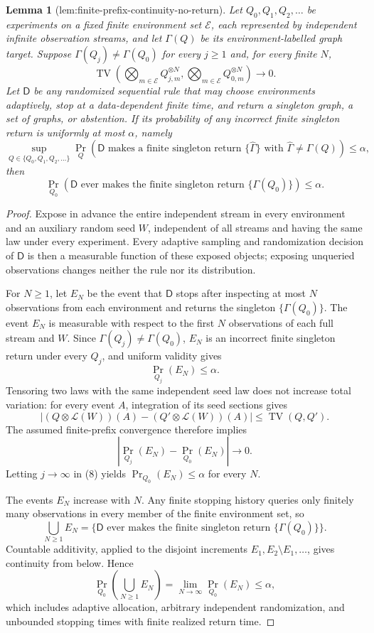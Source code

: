 \documentclass{article}
\newtheorem{lemma}{Lemma}
\begin{document}
\begin{lemma}[lem:finite-prefix-continuity-no-return]\label{lem:finite-prefix-continuity-no-return}
Let \(Q_0,Q_1,Q_2,\ldots\) be experiments on a fixed finite environment set \(\mathcal E\), each represented by independent infinite observation streams, and let \(\Gamma(Q)\) be its environment-labelled graph target.  Suppose \(\Gamma(Q_j)\ne\Gamma(Q_0)\) for every \(j\ge1\) and, for every finite \(N\),
\[
 \operatorname{TV}\!\left(
   \bigotimes_{m\in\mathcal E}Q_{j,m}^{\otimes N},
   \bigotimes_{m\in\mathcal E}Q_{0,m}^{\otimes N}
 \right)\longrightarrow0.
\]
Let \(\mathsf D\) be any randomized sequential rule that may choose environments adaptively, stop at a data-dependent finite time, and return a singleton graph, a set of graphs, or abstention.  If its probability of any incorrect finite singleton return is uniformly at most \(\alpha\), namely
\[
 \sup_{Q\in\{Q_0,Q_1,Q_2,\ldots\}}
 \Pr_Q\!\left(
   \mathsf D\text{ makes a finite singleton return }\{\widehat\Gamma\}
   \text{ with }\widehat\Gamma\ne\Gamma(Q)
 \right)\le\alpha,
\]
then
\[
 \Pr_{Q_0}\!\left(
   \mathsf D\text{ ever makes the finite singleton return }\{\Gamma(Q_0)\}
 \right)\le\alpha.
\]
\end{lemma}
\begin{proof}
Expose in advance the entire independent stream in every environment and an auxiliary random seed \(W\), independent of all streams and having the same law under every experiment.  Every adaptive sampling and randomization decision of \(\mathsf D\) is then a measurable function of these exposed objects; exposing unqueried observations changes neither the rule nor its distribution.

For \(N\ge1\), let \(E_N\) be the event that \(\mathsf D\) stops after inspecting at most \(N\) observations from each environment and returns the singleton \(\{\Gamma(Q_0)\}\).  The event \(E_N\) is measurable with respect to the first \(N\) observations of each full stream and \(W\).  Since \(\Gamma(Q_j)\ne\Gamma(Q_0)\), \(E_N\) is an incorrect finite singleton return under every \(Q_j\), and uniform validity gives
\[
 \Pr_{Q_j}(E_N)\le\alpha.
 \tag{8}
\]
Tensoring two laws with the same independent seed law does not increase total variation: for every event \(A\), integration of its seed sections gives
\[
 |(Q\otimes\mathcal L(W))(A)-(Q'\otimes\mathcal L(W))(A)|
 \le\operatorname{TV}(Q,Q').
\]
The assumed finite-prefix convergence therefore implies
\[
 |\Pr_{Q_j}(E_N)-\Pr_{Q_0}(E_N)|\longrightarrow0.
\]
Letting \(j\to\infty\) in (8) yields \(\Pr_{Q_0}(E_N)\le\alpha\) for every \(N\).

The events \(E_N\) increase with \(N\).  Any finite stopping history queries only finitely many observations in every member of the finite environment set, so
\[
 \bigcup_{N\ge1}E_N
 =\{\mathsf D\text{ ever makes the finite singleton return }\{\Gamma(Q_0)\}\}.
\]
Countable additivity, applied to the disjoint increments \(E_1,E_2\setminus E_1,\ldots\), gives continuity from below.  Hence
\[
 \Pr_{Q_0}\!\left(\bigcup_{N\ge1}E_N\right)
 =\lim_{N\to\infty}\Pr_{Q_0}(E_N)\le\alpha,
\]
which includes adaptive allocation, arbitrary independent randomization, and unbounded stopping times with finite realized return time.
\end{proof}
\end{document}
